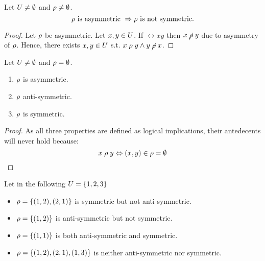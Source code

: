\begin{claim}
  Let $U \neq \emptyset$ and $\rho \neq \emptyset$.
  \[
    \rho \text{ is asymmetric } \Rightarrow \rho \text{ is not symmetric.}
  \]
\end{claim}

\begin{proof}
  Let $\rho$ be asymmetric. Let $x, y \in U$.
  If $\rel{x}{y}$ then $x\mathrel{\cancel{\rho}}y$ due to asymmetry of $\rho$.
  Hence, there exists $x, y \in U$ s.t. $x\mathrel{\rho}y \land y\mathrel{\cancel{\rho}}x$.

\end{proof}

\begin{claim}
  Let $U \neq \emptyset$ and $\rho = \emptyset$.

  \begin{enumerate}
    \item $\rho$ is asymmetric.
    \item $\rho$ anti-symmetric.
    \item $\rho$ is symmetric.
  \end{enumerate}
\end{claim}

\begin{proof}
  As all three properties are defined as logical implications, their antedecents will never hold because:
  \[
    x\mathrel{\rho}y \Leftrightarrow (x, y) \in \rho = \emptyset
  \]
\end{proof}

Let in the following $U = \{1, 2, 3\}$
\begin{itemize}
  \item $\rho = \{(1, 2), (2, 1)\}$ is symmetric but not anti-symmetric.
  \item $\rho = \{(1, 2)\}$ is anti-symmetric but not symmetric.
  \item $\rho = \{(1, 1)\}$ is both anti-symmetric and symmetric.
  \item $\rho = \{(1, 2), (2, 1), (1, 3)\}$ is neither anti-symmetric nor symmetric.
\end{itemize}

